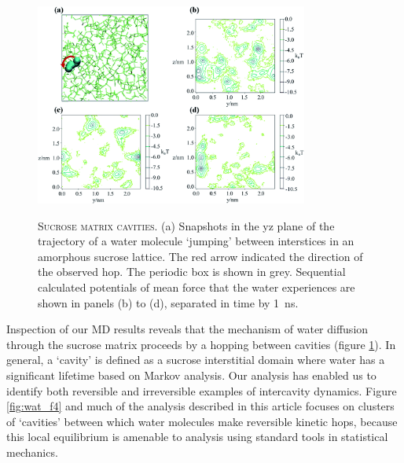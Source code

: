 \begin{figure}
    \centering
    \caption[Sucrose matrix cavities]{\textsc{Sucrose matrix cavities}. (a) Snapshots in the yz plane of the trajectory of a water molecule ‘jumping’ between interstices in an amorphous sucrose lattice. The red arrow indicated the direction of the observed hop. The periodic box is shown in grey. Sequential calculated potentials of mean force that the water experiences are shown in panels (b) to (d), separated in time by \SI{1}{\nano\second}.}
    \includegraphics[width=0.8\textwidth]{chapters/water_hopping/figures/f3.png}
    \label{fig:wat_f3}
\end{figure}

Inspection of our MD results reveals that the mechanism of water diffusion through the sucrose matrix proceeds by a hopping between cavities (figure \ref{fig:wat_f3}). In general, a `cavity’ is defined as a sucrose interstitial domain where water has a significant lifetime based on Markov analysis. Our analysis has enabled us to identify both reversible and irreversible examples of intercavity dynamics. Figure \ref{fig:wat_f4} and much of the analysis described in this article focuses on clusters of `cavities’ between which water molecules make reversible kinetic hops, because this local equilibrium is amenable to analysis using standard tools in statistical mechanics.

